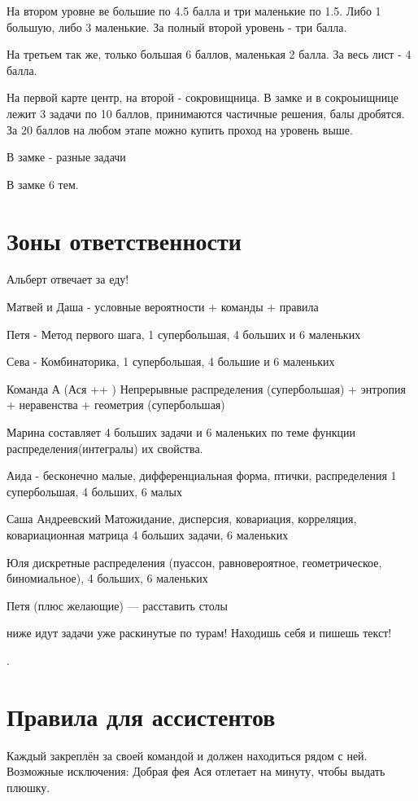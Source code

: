 \documentclass[a4paper,12pt]{article}
\begin{document}
 На втором уровне ве большие по 4.5 балла и три маленькие по 1.5. Либо 1 большую, либо 3 маленькие. За полный второй уровень - три балла.

 На третьем так же, только большая 6 баллов, маленькая 2 балла. За весь лист - 4 балла.

 На первой карте центр, на второй - сокровищница. В замке и в сокроыищнице лежит 3 задачи по 10 баллов, принимаются частичные решения, балы дробятся. За 20 баллов на любом этапе можно купить проход на уровень выше.

 В замке - разные задачи

 В замке 6 тем. \\


\section*{Зоны ответственности}

Альберт отвечает за еду!

Матвей и Даша - условные вероятности + команды + правила

Петя - Метод первого шага, 1 супербольшая, 4 больших и 6 маленьких

Сева - Комбинаторика, 1 супербольшая, 4 большие и 6 маленьких

Команда А (Ася ++ ) Непрерывные распределения (супербольшая) + энтропия + неравенства + геометрия (супербольшая)

Марина составляет 4 больших задачи и 6 маленьких по теме функции распределения(интегралы) их свойства.

Аида - бесконечно малые, дифференциальная форма, птички, распределения 1 супербольшая, 4 больших, 6 малых

Саша Андреевский Матожидание, дисперсия, ковариация, корреляция, ковариационная матрица 4 больших задачи, 6 маленьких

Юля дискретные распределения (пуассон, равновероятное, геометрическое, биномиальное), 4 больших, 6 маленьких

Петя (плюс желающие) — расставить столы





ниже идут задачи уже раскинутые по турам! Находишь себя и пишешь текст!

\contentsname
\tableofcontents.

\section*{Правила для ассистентов}
Каждый закреплён за своей командой и должен находиться рядом с ней. Возможные исключения: Добрая фея Ася отлетает на минуту, чтобы выдать плюшку.
\end{document}
